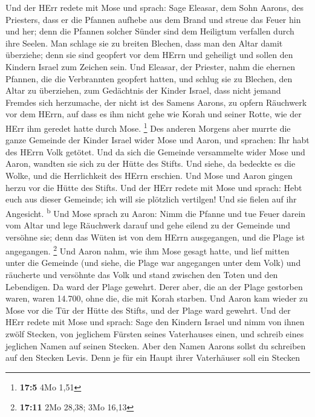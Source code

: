  Und der HErr redete mit Mose und sprach: 
Sage Eleasar, dem Sohn Aarons, des Priesters, dass er die Pfannen
aufhebe aus dem Brand und streue das Feuer hin und her; 
denn die Pfannen solcher Sünder sind dem Heiligtum verfallen durch ihre
Seelen. Man schlage sie zu breiten Blechen, dass man den Altar damit
überziehe; denn sie sind geopfert vor dem HErrn und geheiligt und sollen
den Kindern Israel zum Zeichen sein.  Und Eleasar, der
Priester, nahm die ehernen Pfannen, die die Verbrannten geopfert hatten,
und schlug sie zu Blechen, den Altar zu überziehen,  zum
Gedächtnis der Kinder Israel, dass nicht jemand Fremdes sich herzumache,
der nicht ist des Samens Aarons, zu opfern Räuchwerk vor dem HErrn, auf
dass es ihm nicht gehe wie Korah und seiner Rotte, wie der HErr ihm
geredet hatte durch Mose. \footnote{\textbf{17:5} 4Mo 1,51}
 Des anderen Morgens aber murrte die ganze Gemeinde der
Kinder Israel wider Mose und Aaron, und sprachen: Ihr habt des HErrn
Volk getötet.  Und da sich die Gemeinde versammelte wider
Mose und Aaron, wandten sie sich zu der Hütte des Stifts. Und siehe, da
bedeckte es die Wolke, und die Herrlichkeit des HErrn erschien.
 Und Mose und Aaron gingen herzu vor die Hütte des Stifts.
 Und der HErr redete mit Mose und sprach: 
Hebt euch aus dieser Gemeinde; ich will sie plötzlich vertilgen! Und sie
fielen auf ihr Angesicht. \textsuperscript{b}  Und Mose
sprach zu Aaron: Nimm die Pfanne und tue Feuer darein vom Altar und lege
Räuchwerk darauf und gehe eilend zu der Gemeinde und versöhne sie; denn
das Wüten ist von dem HErrn ausgegangen, und die Plage ist angegangen.
\footnote{\textbf{17:11} 2Mo 28,38; 3Mo 16,13}  Und Aaron
nahm, wie ihm Mose gesagt hatte, und lief mitten unter die Gemeinde (und
siehe, die Plage war angegangen unter dem Volk) und räucherte und
versöhnte das Volk  und stand zwischen den Toten und den
Lebendigen. Da ward der Plage gewehrt.  Derer aber, die
an der Plage gestorben waren, waren 14.700, ohne die, die mit Korah
starben.  Und Aaron kam wieder zu Mose vor die Tür der
Hütte des Stifts, und der Plage ward gewehrt.  Und der
HErr redete mit Mose und sprach:  Sage den Kindern Israel
und nimm von ihnen zwölf Stecken, von jeglichem Fürsten seines
Vaterhauses einen, und schreib eines jeglichen Namen auf seinen Stecken.
 Aber den Namen Aarons sollst du schreiben auf den
Stecken Levis. Denn je für ein Haupt ihrer Vaterhäuser soll ein Stecken
